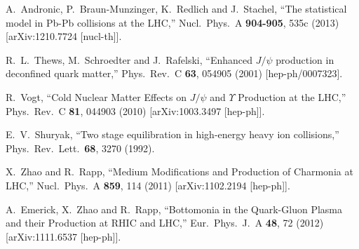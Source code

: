 \documentclass[aps,prc,preprint,superscriptaddress,showpacs,showkeys]{revtex4-1}
\begin{document}
\begin{thebibliography}{100}
  A.~Andronic, P.~Braun-Munzinger, K.~Redlich and J.~Stachel,
  ``The statistical model in Pb-Pb collisions at the LHC,''
  Nucl.\ Phys.\ A {\bf 904-905}, 535c (2013)
  [arXiv:1210.7724 [nucl-th]].

  R.~L.~Thews, M.~Schroedter and J.~Rafelski,
  ``Enhanced $J/\psi$ production in deconfined quark matter,''
  Phys.\ Rev.\ C {\bf 63}, 054905 (2001)
  [hep-ph/0007323].


  R.~Vogt,
  ``Cold Nuclear Matter Effects on $J/\psi$ and $\Upsilon$ Production at the LHC,''
  Phys.\ Rev.\ C {\bf 81}, 044903 (2010)
  [arXiv:1003.3497 [hep-ph]].

  E.~V.~Shuryak,
  ``Two stage equilibration in high-energy heavy ion collisions,''
  Phys.\ Rev.\ Lett.\  {\bf 68}, 3270 (1992).


  X.~Zhao and R.~Rapp,
  ``Medium Modifications and Production of Charmonia at LHC,''
  Nucl.\ Phys.\ A {\bf 859}, 114 (2011)
  [arXiv:1102.2194 [hep-ph]].

  A.~Emerick, X.~Zhao and R.~Rapp,
  ``Bottomonia in the Quark-Gluon Plasma and their Production at RHIC and LHC,''
  Eur.\ Phys.\ J.\ A {\bf 48}, 72 (2012)
  [arXiv:1111.6537 [hep-ph]].




\end{thebibliography}
\end{document}
